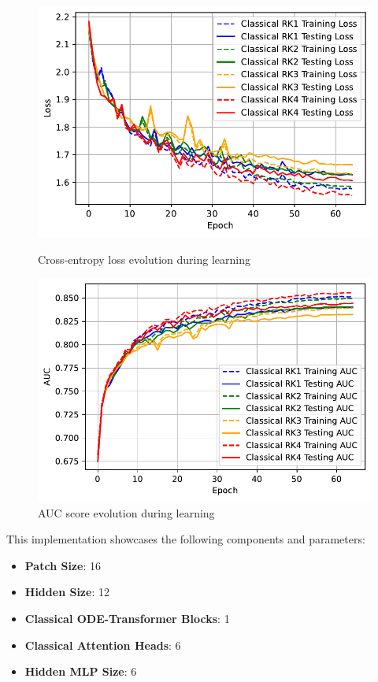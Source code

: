 \documentclass[12pt,a4paper]{report}
\begin{document}
\begin{figure}[th]
  \centering
  \includegraphics[scale=0.88]{./pics/new_pdf_graphs/classical/3_enc_1_rk_1_dec/classical_transfomer_loss_cifar10_rk1_rk2_rk3_rk4.pdf}
  \caption[Cross-entropy loss evolution during learning]{Cross-entropy loss evolution during learning}
  \label{fig:p29}
  \vspace*{\floatsep}
  \centering
  \includegraphics[scale=0.88]{./pics/new_pdf_graphs/classical/3_enc_1_rk_1_dec/classical_transfomer_auc_cifar10_rk1_rk2_rk3_rk4.pdf}
  \caption[AUC score evolution during learning]{AUC score evolution during learning}
  \label{fig:p30}
\end{figure}

This implementation showcases the following components and parameters:
\begin{itemize}
  \item \textbf{Patch Size}: 16
  \item \textbf{Hidden Size}: 12
  \item \textbf{Classical ODE-Transformer Blocks}: 1
  \item \textbf{Classical Attention Heads}: 6
  \item \textbf{Hidden MLP Size}: 6
\end{itemize}
\end{document}

